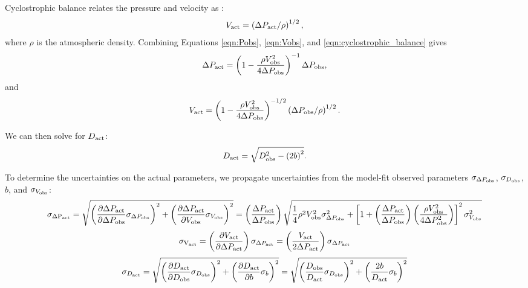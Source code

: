 \documentclass{aastex63}
\begin{document}
Cyclostrophic balance relates the pressure and velocity as \citep{2020Icar..33813523J}:
\begin{equation}
    V_{\rm act} = \left( \Delta P_{\rm act}/\rho \right)^{1/2},\label{eqn:cyclostrophic_balance}
\end{equation}
where $\rho$ is the atmospheric density. Combining Equations \ref{eqn:Pobs}, \ref{eqn:Vobs}, and \ref{eqn:cyclostrophic_balance} gives
\begin{equation}
    \Delta P_{\rm act} = \left( 1 - \frac{\rho V_{\rm obs}^2}{4 \Delta P_{\rm obs}} \right)^{-1} \Delta P_{\rm obs},\label{eqn:solution_for_Pact}
\end{equation}
and
\begin{equation}
    V_{\rm act} = \left( 1 - \frac{\rho V_{\rm obs}^2}{4 \Delta P_{\rm obs}} \right)^{-1/2} \left( \Delta P_{\rm obs}/\rho \right)^{1/2}.\label{eqn:solution_for_Vact}
\end{equation}

We can then solve for $D_{\rm act}$:
\begin{equation}
    D_{\rm act} = \sqrt{ D_{\rm obs}^2 - \left( 2 b\right)^2 }.\label{eqn:actual_diameter}
\end{equation}

To determine the uncertainties on the actual parameters, we propagate uncertainties from the model-fit observed parameters $\sigma_{\Delta P_{\rm obs}}$, $\sigma_{D_{\rm obs}}$, $b$, and $\sigma_{V_{\rm obs}}$:
\begin{equation}
    \sigma_{\rm \Delta P_{\rm act}} = \sqrt{ \left( \frac{\partial \Delta P_{\rm act}}{\partial \Delta P_{\rm obs}} \sigma_{\Delta P_{\rm obs}} \right)^2 + \left( \frac{\partial \Delta P_{\rm act}}{\partial V_{\rm obs}} \sigma_{V_{\rm obs}} \right)^2 } = \left( \frac{\Delta P_{\rm act}}{\Delta P_{\rm obs}} \right) \sqrt{ \frac{1}{4} \rho^2 V_{\rm obs}^2 \sigma_{\Delta P_{\rm obs}}^2 + \left[ 1 + \left( \frac{\Delta P_{\rm act}}{\Delta P_{\rm obs}} \right) \left( \frac{\rho V_{\rm obs}^2}{4 \Delta P_{\rm obs}^2} \right) \right]^2 \sigma_{V_{\rm obs}}^2 }
\end{equation}
\begin{equation}
    \sigma_{\rm V_{\rm act}} = \left( \frac{\partial V_{\rm act}}{\partial \Delta P_{\rm act}} \right) \sigma_{\Delta P_{\rm act}} = \left( \frac{V_{\rm act}}{2\Delta P_{\rm act}} \right) \sigma_{\Delta P_{\rm act}}
\end{equation}
\begin{equation}
    \sigma_{D_{\rm act}} = \sqrt{ \left( \frac{\partial D_{\rm act}}{\partial D_{\rm obs}} \sigma_{D_{\rm obs}} \right)^2 + \left( \frac{\partial D_{\rm act}}{\partial b} \sigma_{b}\right)^2 } = \sqrt{ \left( \frac{D_{\rm obs}}{D_{\rm act}} \sigma_{D_{\rm obs}}\right)^2 + \left( \frac{2b}{D_{\rm act}} \sigma_{b} \right)^2 }
\end{equation}
\end{document}
